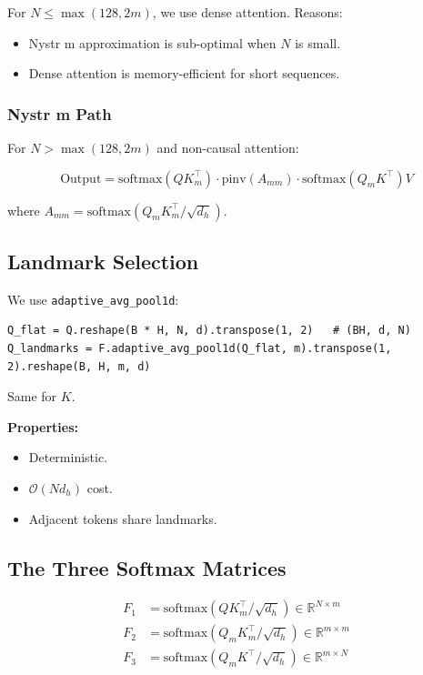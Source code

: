 For $N \leq \max(128, 2m)$, we use dense attention. Reasons:

\begin{itemize}
\item Nystr m approximation is sub-optimal when $N$ is small.
\item Dense attention is memory-efficient for short sequences.

\end{itemize}
\subsubsection{Nystr m Path}

For $N > \max(128, 2m)$ and non-causal attention:

\[
\text{Output} = \text{softmax}(Q K_m^\top) \cdot \text{pinv}(A_{mm}) \cdot \text{softmax}(Q_m K^\top) V
\tag{4.1}
\]

where $A_{mm} = \text{softmax}(Q_m K_m^\top / \sqrt{d_h})$.

\subsection{Landmark Selection}

We use \texttt{adaptive\_avg\_pool1d}:

\begin{lstlisting}
Q_flat = Q.reshape(B * H, N, d).transpose(1, 2)   # (BH, d, N)
Q_landmarks = F.adaptive_avg_pool1d(Q_flat, m).transpose(1, 2).reshape(B, H, m, d)
\end{lstlisting}

Same for $K$.

\textbf{Properties:}
\begin{itemize}
\item Deterministic.
\item $\mathcal{O}(N d_h)$ cost.
\item Adjacent tokens share landmarks.

\end{itemize}
\subsection{The Three Softmax Matrices}

\[
\begin{aligned}
F_1 &= \text{softmax}(Q K_m^\top / \sqrt{d_h}) \in \mathbb{R}^{N \times m} \\
F_2 &= \text{softmax}(Q_m K_m^\top / \sqrt{d_h}) \in \mathbb{R}^{m \times m} \\
F_3 &= \text{softmax}(Q_m K^\top / \sqrt{d_h}) \in \mathbb{R}^{m \times N}
\end{aligned}
\tag{4.2}
\]

